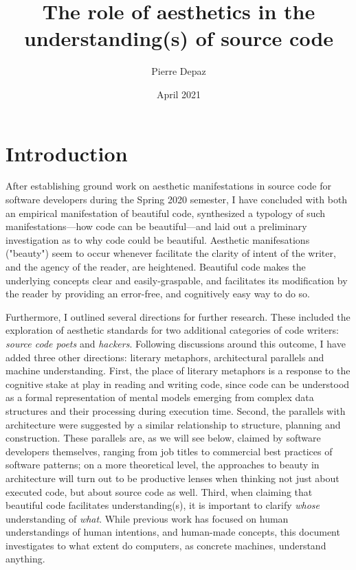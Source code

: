 \documentclass{article}
\begin{document}
\title{The role of aesthetics in the understanding(s) of source code}
\author{Pierre Depaz}
\date{April 2021}
\maketitle

\section{Introduction}

After establishing ground work on aesthetic manifestations in source code for software developers during the Spring 2020 semester, I have concluded with both an empirical manifestation of beautiful code, synthesized a typology of such manifestations—how code can be beautiful—and laid out a preliminary investigation as to why code could be beautiful. Aesthetic manifesations ("beauty") seem to occur whenever facilitate the clarity of intent of the writer, and the agency of the reader, are heightened. Beautiful code makes the underlying concepts clear and easily-graspable, and facilitates its modification by the reader by providing an error-free, and cognitively easy way to do so.

Furthermore, I outlined several directions for further research. These included the exploration of aesthetic standards for two additional categories of code writers: \emph{source code poets} and \emph{hackers}. Following discussions around this outcome, I have added three other directions: literary metaphors, architectural parallels and machine understanding. First, the place of literary metaphors is a response to the cognitive stake at play in reading and writing code, since code can be understood as a formal representation of mental models emerging from complex data structures and their processing during execution time. Second, the parallels with architecture were suggested by a similar relationship to structure, planning and construction. These parallels are, as we will see below, claimed by software developers themselves, ranging from job titles to commercial best practices of software patterns; on a more theoretical level, the approaches to beauty in architecture will turn out to be productive lenses when thinking not just about executed code, but about source code as well. Third, when claiming that beautiful code facilitates understanding(s), it is important to clarify \emph{whose} understanding of \emph{what}. While previous work has focused on human understandings of human intentions, and human-made concepts, this document investigates to what extent do computers, as concrete machines, understand anything.
\end{document}
